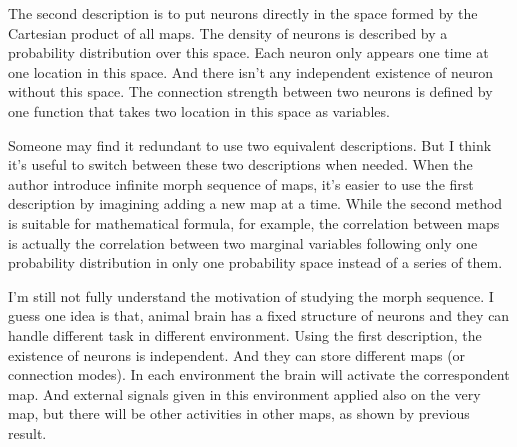 \documentclass{article}
\begin{document}
	
	The second description is to put neurons directly in the space formed by the Cartesian product of all maps. The density of neurons is described by a probability distribution over this space. Each neuron only appears one time at one location in this space. And there isn't any independent existence of neuron without this space. The connection strength between two neurons is defined by one function that takes two location in this space as variables.
	
	Someone may find it redundant to use two equivalent descriptions. But I think it's useful to switch between these two descriptions when needed. When the author introduce infinite morph sequence of maps, it's easier to use the first description by imagining adding a new map at a time. While the second method is suitable for mathematical formula, for example, the correlation between maps is actually the correlation between two marginal variables following only one probability distribution in only one probability space instead of a series of them.
	
	I'm still not fully understand the motivation of studying the morph sequence. I guess one idea is that, animal brain has a fixed structure of neurons and they can handle different task in different environment. Using the first description, the existence of neurons is independent. And they can store different maps (or connection modes). In each environment the brain will activate the correspondent map. And external signals given in this environment applied also on the very map, but there will be other activities in other maps, as shown by previous result.


\end{document}
